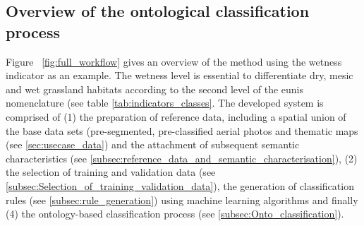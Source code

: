 \documentclass[authoryear,review,12pt,number]{elsarticle}
\begin{document}
\subsection{Overview of the ontological classification process}
\label{subsec:method_overview}
Figure ~\ref{fig:full_workflow} gives an overview of the method using the
wetness indicator as an example. The wetness level is essential to
differentiate dry, mesic and wet grassland habitats according to the second
level of the \gls{eunis} nomenclature (see table \ref{tab:indicators_classes}.
The developed system is comprised of (1) the preparation of reference
data, including a spatial union of the base data sets (pre-segmented,
pre-classified aerial photos and thematic maps (see
\ref{sec:usecase_data}) and the attachment of
subsequent semantic characteristics (see 
\ref{subsec:reference_data_and_semantic_characterisation}), (2)
the selection of training and validation data (see
\ref{subsec:Selection_of_training_validation_data}), the generation of
classification rules (see 
\ref{subsec:rule_generation}) using machine learning algorithms and
finally (4) the ontology-based classification process (see \ref{subsec:Onto_classification}). 
\end{document}
